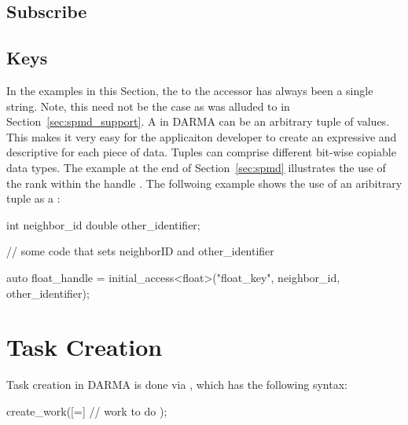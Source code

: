 
\subsection{Subscribe}
\label{subsec:subscribe}

\subsection{Keys}
\label{subsec:keys}
In the examples in this Section, the  to the accessor has always been a
single string.  Note, this need not be the case as was alluded to in
Section~\ref{sec:spmd_support}. A
 in DARMA 
can be an arbitrary \gls{tuple} of values.  This 
makes it very easy for the applicaiton developer to create an expressive
and descriptive  for each piece of data.  Tuples can comprise
different bit-wise copiable data types.  The example at the end of
Section~\ref{sec:spmd} illustrates the use of the \gls{rank} within the handle
.  The follwoing example shows the use of an
aribitrary \gls{tuple} as a :
\begin{CppCode}
  int neighbor_id
  double other_identifier;

  // some code that sets neighborID and other_identifier
  
  auto float_handle = initial_access<float>("float_key", 
                                            neighbor_id, 
                                            other_identifier);
\end{CppCode}


\section{Task Creation}
\label{sec:deferred}
Task creation in DARMA is done via , which has the
following syntax:
\begin{CppCode}
  create_work([=]
  {
    // work to do
  });
\end{CppCode}

